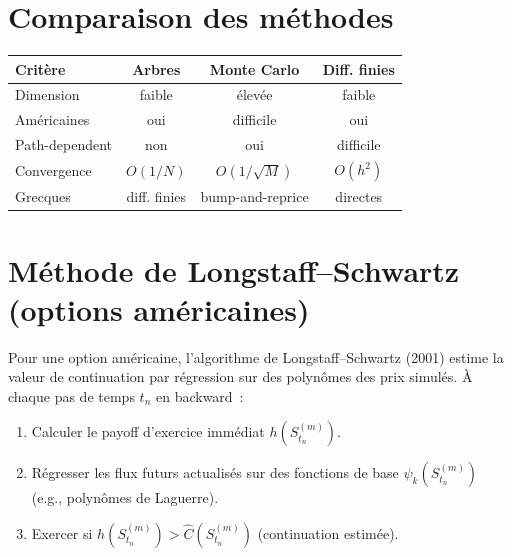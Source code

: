 \section{Comparaison des m\'ethodes}

\begin{center}
\begin{tabular}{lccc}
    \toprule
    \textbf{Crit\`ere} & \textbf{Arbres} & \textbf{Monte Carlo}
    & \textbf{Diff. finies} \\
    \midrule
    Dimension & faible & \'elev\'ee & faible \\
    Am\'ericaines & oui & difficile & oui \\
    Path-dependent & non & oui & difficile \\
    Convergence & $O(1/N)$ & $O(1/\sqrt{M})$ & $O(h^2)$ \\
    Grecques & diff. finies & bump-and-reprice & directes \\
    \bottomrule
\end{tabular}
\end{center}

\section{M\'ethode de Longstaff--Schwartz (options am\'ericaines)}

\begin{theoreme}
Pour une option am\'ericaine, l'algorithme de Longstaff--Schwartz (2001)
estime la valeur de continuation par r\'egression sur des polyn\^omes
des prix simul\'es. \`A chaque pas de temps $t_n$ en backward~:
\begin{enumerate}
    \item Calculer le payoff d'exercice imm\'ediat $h(S_{t_n}^{(m)})$.
    \item R\'egresser les flux futurs actualis\'es sur des fonctions de base
          $\psi_k(S_{t_n}^{(m)})$ (e.g., polyn\^omes de Laguerre).
    \item Exercer si $h(S_{t_n}^{(m)}) > \hat{C}(S_{t_n}^{(m)})$
          (continuation estim\'ee).
\end{enumerate}
\end{theoreme}

